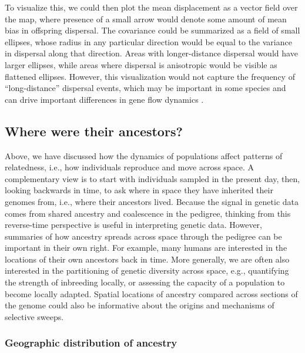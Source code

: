 \documentclass{ar-1col}
\begin{document}
To visualize this,
we could then plot the mean displacement as a vector field over the map,
where presence of a small arrow would denote some amount of mean bias in offspring dispersal.
The covariance could be summarized as a field of small ellipses,
whose radius in any particular direction would be equal to the variance in dispersal
along that direction.
Areas with longer-distance dispersal would have larger ellipses,
while areas where dispersal is anisotropic would be visible as flattened ellipses.
However, this visualization would not capture the frequency of ``long-distance'' dispersal events,
which may be important in some species \citep{levin_et_al_seed_dispersal}
and can drive important differences in gene flow dynamics \citep{HallatschekFisher2014}.

\subsection{Where were their ancestors?}

Above, we have discussed how the dynamics of populations affect
patterns of relatedness,
i.e., how individuals reproduce and move across space.
A complementary view is to
start with individuals sampled in the present day,
then, looking backwards in time,
to ask where in space they have inherited their genomes from, 
i.e., where their ancestors lived.
Because the signal in genetic data comes from 
shared ancestry and coalescence in the pedigree,
thinking from this reverse-time perspective 
is useful in interpreting genetic data.
However, summaries of how ancestry spreads across space 
through the pedigree can be important in their own right.
For example, many humans are interested
in the locations of their own ancestors back in time.
More generally,
we are often also interested in the partitioning of genetic diversity across space,
e.g.,
quantifying the strength of inbreeding locally,
or assessing the capacity of a population to become locally adapted.
Spatial locations of ancestry compared across sections of the genome
could also be informative about the origins and mechanisms of selective sweeps.


\subsubsection{Geographic distribution of ancestry}
\end{document}
